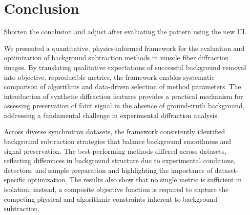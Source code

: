 \documentclass[iucr]{iucrjournals}
\begin{document}



\section{Conclusion} 

{\color{blue} Shorten the conclusion and adjust after evaluating the pattern using the new UI.}

We presented a quantitative, physics-informed framework for the evaluation and optimization of background subtraction methods in muscle fiber diffraction images. By translating qualitative expectations of successful background removal into objective, reproducible metrics, the framework enables systematic comparison of algorithms and data-driven selection of method parameters. The introduction of synthetic diffraction features provides a practical mechanism for assessing preservation of faint signal in the absence of ground-truth background, addressing a fundamental challenge in experimental diffraction analysis.

Across diverse synchrotron datasets, the framework consistently identified background subtraction strategies that balance background smoothness and signal preservation. The best-performing methods differed across datasets, reflecting differences in background structure due to experimental conditions, detectors, and sample preparation and highlighting the importance of dataset-specific optimization. The results also show that no single metric is sufficient in isolation; instead, a composite objective function is required to capture the competing physical and algorithmic constraints inherent to background subtraction.
\end{document}
